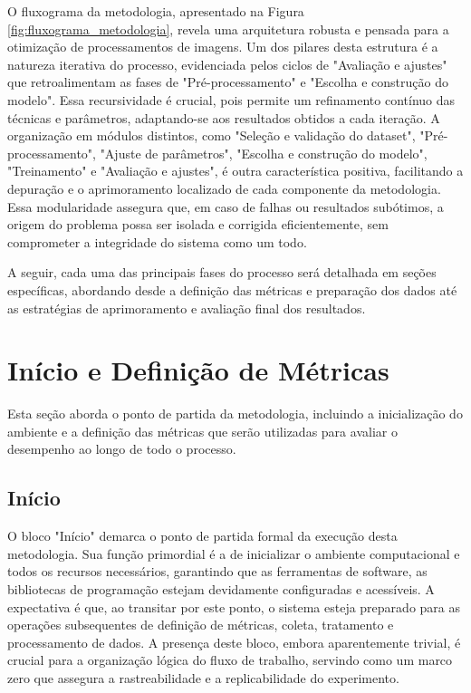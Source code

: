 O fluxograma da metodologia, apresentado na Figura \ref{fig:fluxograma_metodologia}, revela uma arquitetura robusta e pensada para a otimização de processamentos de imagens. Um dos pilares desta estrutura é a natureza iterativa do processo, evidenciada pelos ciclos de "Avaliação e ajustes" que retroalimentam as fases de "Pré-processamento" e "Escolha e construção do modelo". Essa recursividade é crucial, pois permite um refinamento contínuo das técnicas e parâmetros, adaptando-se aos resultados obtidos a cada iteração. A organização em módulos distintos, como "Seleção e validação do dataset", "Pré-processamento", "Ajuste de parâmetros", "Escolha e construção do modelo", "Treinamento" e "Avaliação e ajustes", é outra característica positiva, facilitando a depuração e o aprimoramento localizado de cada componente da metodologia. Essa modularidade assegura que, em caso de falhas ou resultados subótimos, a origem do problema possa ser isolada e corrigida eficientemente, sem comprometer a integridade do sistema como um todo.

A seguir, cada uma das principais fases do processo será detalhada em seções específicas, abordando desde a definição das métricas e preparação dos dados até as estratégias de aprimoramento e avaliação final dos resultados.

\section{Início e Definição de Métricas}

Esta seção aborda o ponto de partida da metodologia, incluindo a inicialização do ambiente e a definição das métricas que serão utilizadas para avaliar o desempenho ao longo de todo o processo.

\subsection{Início}
O bloco "Início" demarca o ponto de partida formal da execução desta metodologia. Sua função primordial é a de inicializar o ambiente computacional e todos os recursos necessários, garantindo que as ferramentas de software, as bibliotecas de programação estejam devidamente configuradas e acessíveis. A expectativa é que, ao transitar por este ponto, o sistema esteja preparado para as operações subsequentes de definição de métricas, coleta, tratamento e processamento de dados. A presença deste bloco, embora aparentemente trivial, é crucial para a organização lógica do fluxo de trabalho, servindo como um marco zero que assegura a rastreabilidade e a replicabilidade do experimento.


